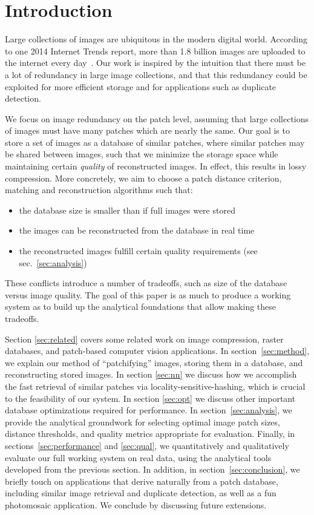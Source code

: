 \section{Introduction}

Large collections of images are ubiquitous in the modern digital world.
According to one 2014 Internet Trends report,
more than 1.8 billion images are uploaded to the internet every day~\cite{meeker2014internet}.
Our work is inspired by the intuition that there must be a lot of redundancy
in large image collections, and that this redundancy could
be exploited for more efficient storage and for applications such as duplicate detection.

We focus on image redundancy on the patch level, assuming that large collections
of images must have many patches which are nearly the same.
Our goal is to store a set of images as a database of
similar patches, where similar patches may be shared between images,
 such that we minimize the storage space while maintaining certain \emph{quality}
of reconstructed images. In effect, this results in lossy compression. More concretely,
we aim to choose a patch distance criterion, matching and reconstruction algorithms such
that:
\begin{itemize}
\item the database size is smaller than if full images were stored
\item the images can be reconstructed from the database in real time
\item the reconstructed images fulfill certain quality requirements (see sec.~\ref{sec:analysis})
\end{itemize}
These conflicts introduce a number of tradeoffs, such as size of
the database versus image quality.
The goal of this paper is as much to produce a working system as to
build up the analytical foundations that allow making these tradeoffs.

Section \ref{sec:related} covers some related work on image compression, raster databases, and patch-based computer vision applications.
In section~\ref{sec:method}, we explain our method of ``patchifying'' images,
storing them in a database, and reconstructing stored images. 
In section \ref{sec:nn} we discuss how we accomplish the fast retrieval of similar patches via locality-sensitive-hashing, which is crucial to the feasibility of our system. In section \ref{sec:opt} we discuss other important database optimizations required for performance. 
In section~\ref{sec:analysis}, we provide the analytical groundwork for
selecting optimal image patch sizes, distance thresholds, and quality metrics
appropriate for evaluation. Finally, in sections~\ref{sec:performance} and \ref{sec:qual},
we quantitatively and qualitatively evaluate our full working system on real data, using the analytical tools developed from the previous section. 
In addition, in section~\ref{sec:conclusion}, we briefly touch on applications that derive naturally
from a patch database, including similar image retrieval and duplicate detection, as well as a fun photomosaic application. We conclude by discussing future extensions.
